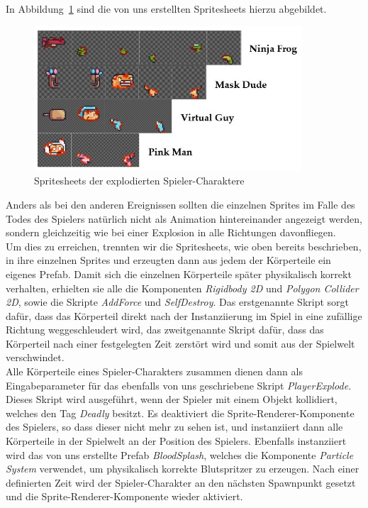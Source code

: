 In Abbildung~\ref{fig:spritesheets_exploded} sind die von uns erstellten Spritesheets hierzu abgebildet.\\

\begin{figure}[th]
\centering
\includegraphics[width=100mm]{Figures/spritesheets_exploded.jpg}
\decoRule
\caption[Spritesheets der explodierten Spieler-Charaktere]{Spritesheets der explodierten Spieler-Charaktere}
\label{fig:spritesheets_exploded}
\end{figure}

Anders als bei den anderen Ereignissen sollten die einzelnen Sprites im Falle des Todes des Spielers natürlich nicht als Animation hintereinander angezeigt werden, sondern gleichzeitig wie bei einer Explosion in alle Richtungen davonfliegen.\\

Um dies zu erreichen, trennten wir die Spritesheets, wie oben bereits beschrieben, in ihre einzelnen Sprites und erzeugten dann aus jedem der Körperteile ein eigenes Prefab. Damit sich die einzelnen Körperteile später physikalisch korrekt verhalten, erhielten sie alle die Komponenten \textit{Rigidbody 2D} und \textit{Polygon Collider 2D}, sowie die Skripte \textit{AddForce} und \textit{SelfDestroy}. Das erstgenannte Skript sorgt dafür, dass das Körperteil direkt nach der Instanziierung im Spiel in eine zufällige Richtung weggeschleudert wird, das zweitgenannte Skript dafür, dass das Körperteil nach einer festgelegten Zeit zerstört wird und somit aus der Spielwelt verschwindet.\\

Alle Körperteile eines Spieler-Charakters zusammen dienen dann als Eingabeparameter für das ebenfalls von uns geschriebene Skript \textit{PlayerExplode}. Dieses Skript wird ausgeführt, wenn der Spieler mit einem Objekt kollidiert, welches den Tag \textit{Deadly} besitzt. Es deaktiviert die Sprite-Renderer-Komponente des Spielers, so dass dieser nicht mehr zu sehen ist, und instanziiert dann alle Körperteile in der Spielwelt an der Position des Spielers. Ebenfalls instanziiert wird das von uns erstellte Prefab \textit{BloodSplash}, welches die Komponente \textit{Particle System} verwendet, um physikalisch korrekte Blutspritzer zu erzeugen. Nach einer definierten Zeit wird der Spieler-Charakter an den nächsten Spawnpunkt gesetzt und die Sprite-Renderer-Komponente wieder aktiviert.\\

